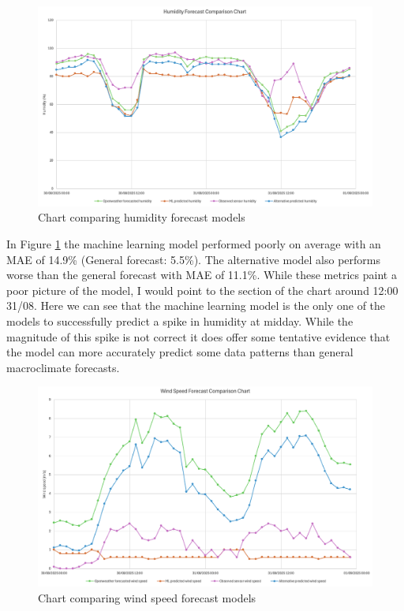 \begin{figure}[H]
    \centering
    \includegraphics[width=1\textwidth]{contents/part-4/fig4/humidity-graph.png}
    \caption{Chart comparing humidity forecast models}
    \label{fig:humidity-chart}
\end{figure}

In Figure \ref{fig:humidity-chart} the machine learning model performed poorly
on average with an MAE of 14.9\% (General forecast: 5.5\%). The alternative
model also performs worse than the general forecast with MAE of 11.1\%. While
these metrics paint a poor picture of the model, I would point to the section of
the chart around 12:00 31/08. Here we can see that the machine learning model is
the only one of the models to successfully predict a spike in humidity at
midday. While the magnitude of this spike is not correct it does offer some
tentative evidence that the model can more accurately predict some data patterns
than general macroclimate forecasts.

\begin{figure}[H]
    \centering
    \includegraphics[width=1\textwidth]{contents/part-4/fig4/wind-speed-graph.png}
    \caption{Chart comparing wind speed forecast models}
    \label{fig:wind-chart}
\end{figure}


